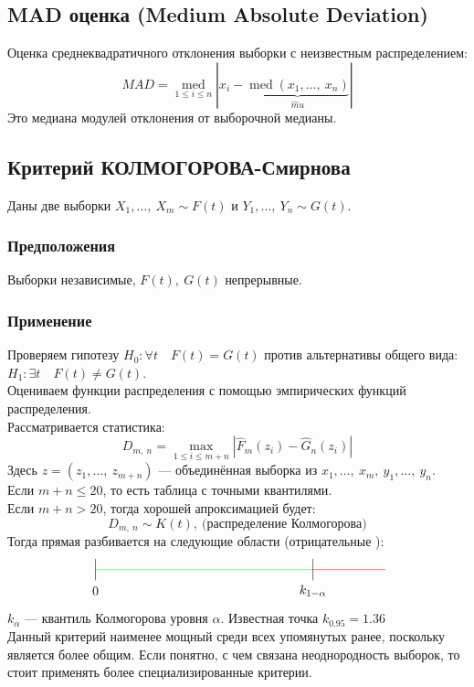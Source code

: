 \documentclass[12pt, a4paper]{article}
\begin{document}
\subsection*{MAD оценка (Medium Absolute Deviation)}
Оценка среднеквадратичного отклонения выборки с неизвестным распределением:
\[MAD = \underset{1 \leq i \leq n}{\operatorname{med}}\left| x_i - \underset{\hat mu}{\underbrace{\operatorname{med}(x_1,\dots,\ x_n)}} \right|\]
Это медиана модулей отклонения от выборочной медианы.
\subsection*{Критерий КОЛМОГОРОВА-Смирнова}
Даны две выборки $X_1,\dots,\ X_m \sim F(t)$ и $Y_1,\dots,\ Y_n \sim G(t)$.
\subsubsection*{Предположения}
Выборки независимые, $F(t),\ G(t)$ непрерывные.
\subsubsection*{Применение}
Проверяем гипотезу $H_0: \forall t\quad F(t) = G(t)$ против альтернативы общего вида: $H_1: \exists t\quad F(t) \neq G(t)$.\\
Оцениваем функции распределения с помощью эмпирических функций распределения.\\
Рассматривается статистика:
\[D_{m,\ n} = \max\limits_{1 \leq i \leq m + n} \left| \hat F_{m}(z_i) - \hat G_{n}(z_i) \right|\]
Здесь $z = (z_1,\dots,\ z_{m + n})$ --- объединённая выборка из $x_1,\dots,\ x_m,\ y_1,\dots,\ y_n$.\\
Если $m + n \leq 20$, то есть таблица с точными квантилями.\\
Если $m + n > 20$, тогда хорошей апроксимацией будет:
\[D_{m,\ n} \sim K(t),\ \text{(распределение Колмогорова)}\]
Тогда прямая разбивается на следующие области (отрицательные ):
\[\begin{tikzpicture}[scale = 2]
    \draw[color=green] (-2, 0) -- (1, 0);
    \draw[color=red] (1, 0) -- (2, 0);
    \draw (1, 0.15) -- (1, -0.15);
    \draw (-2, 0.15) -- ++(0, -0.3);
    \node at (-2, -0.3) (0) {0};
    \node at (1, -0.3) (a) {$k_{1 - \alpha}$};
\end{tikzpicture}\]
$k_{\alpha}$ --- квантиль Колмогорова уровня $\alpha$. Известная точка $k_{0.95} = 1.36$\\
Данный критерий наименее мощный среди всех упомянутых ранее, поскольку является более общим. Если понятно, с чем связана неоднородность выборок, то стоит применять более специализированные критерии.
\end{document}
